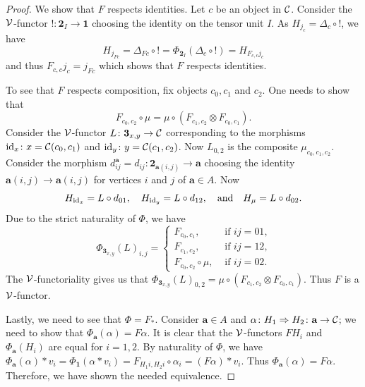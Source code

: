 \begin{proof}
We show that $F$ respects identities. Let $c$ be an object in $\mathcal{C}$. Consider the $\mathcal{V}$-functor $!\colon \textbf{2}_I\to \textbf{1}$ choosing the identity on the tensor unit $I$. As $H_{j_c} = \Delta_c\circ !$, we have
$$
H_{j_{Fc}} = \Delta_{Fc}\circ ! = \Phi_{\textbf{2}_I}(\Delta_c\circ !) = H_{F_{c,c}j_c}
$$
and thus $F_{c,c} j_c = j_{Fc}$ which shows that $F$ respects identities.

To see that $F$ respects composition, fix objects $c_0,c_1$ and $c_2$. One needs to show that
$$
F_{c_0,c_2}\circ \mu = \mu \circ (F_{c_1,c_2}\otimes F_{c_0,c_1}). 
$$
Consider the $\mathcal{V}$-functor $L\colon \textbf{3}_{x,y}\to \mathcal{C}$ corresponding to the morphisms $\mathrm{id}_x\colon x = \mathcal{C}(c_0,c_1)$ and $\mathrm{id}_y\colon y = \mathcal{C}(c_1,c_2)$. Now $L_{0,2}$ is the composite $\mu_{c_0,c_1,c_2}$. Consider the morphism $d_{ij}^\textbf{a} = d_{ij}\colon \textbf{2}_{\textbf{a}(i,j)}\to \textbf{a}$ choosing the identity $\textbf{a}(i,j)\to \textbf{a}(i,j)$ for vertices $i$ and $j$ of $\textbf{a}\in A$. Now
$$
H_{\mathrm{id}_x} = L\circ d_{01}, \quad H_{\mathrm{id}_y} = L\circ d_{12},\quad  \text{and}\quad H_\mu = L\circ d_{02}.
$$
Due to the strict naturality of $\Phi$, we have
$$
\Phi_{\textbf{3}_{x,y}}(L)_{i,j} = \begin{cases}
    F_{c_0,c_1}, &\text{ if $ij = 01$,}\\
    F_{c_1,c_2}, &\text{ if $ij = 12$,}\\
    F_{c_0,c_2}\circ \mu, &\text{ if $ij = 02$.}
\end{cases}
$$
The $\mathcal{V}$-functoriality gives us that $\Phi_{\textbf{3}_{x,y}}(L)_{0,2} = \mu\circ (F_{c_1,c_2}\otimes F_{c_0,c_1})$. Thus $F$ is a $\mathcal{V}$-functor.

Lastly, we need to see that $\Phi = F_*$. Consider $\textbf{a}\in A$ and $\alpha\colon H_1\Rightarrow H_2\colon \textbf{a}\to \mathcal{C}$; we need to show that $\Phi_\textbf{a}(\alpha) = F\alpha$. It is clear that the $\mathcal{V}$-functors $FH_i$ and $\Phi_\textbf{a}(H_i)$ are equal for $i = 1,2$. By naturality of $\Phi$, we have $\Phi_\textbf{a}(\alpha)*v_i = \Phi_\textbf{1}(\alpha*v_i)= F_{H_1i,H_2i}\circ \alpha_i= (F\alpha)*v_i$. Thus $\Phi_\textbf{a}(\alpha) = F\alpha$. Therefore, we have shown the needed equivalence.
\end{proof}